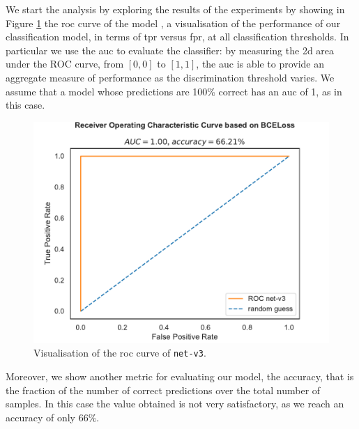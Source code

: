 We start the analysis by exploring the results of the experiments by showing in 
Figure \ref{fig:net-v3auc} the \gls{roc} curve of the model 
\cite[see][]{fawcett2006introduction}, a visualisation of the performance of our 
classification model, in terms of \gls{tpr} versus \gls{fpr}, at all classification 
thresholds.
In particular we use the \gls{auc} to evaluate the classifier: by measuring the 
\gls{2d} area under the ROC curve, from $[0, 0]$ to $[1, 1]$, the \gls{auc} is able 
to provide an aggregate measure of performance as the discrimination threshold 
varies.
We assume that a model whose predictions are 100\% correct has an \gls{auc} of 
1, as in this case.
\begin{figure}[!htb]
	\centering
	\includegraphics[width=.5\textwidth]{contents/images/net-v3/roc-net-v3}%
	\caption[Evaluation of the \gls{roc} of \texttt{net-v3}.]{Visualisation of the 
		\gls{roc} curve of \texttt{net-v3}.}
	\label{fig:net-v3auc}
\end{figure}
Moreover, we show another metric for evaluating our model, the accuracy, that is 
the fraction of the number of correct predictions over the total number of 
samples. In this case the value obtained is not very satisfactory, as we reach an 
accuracy of only $66\%$.

